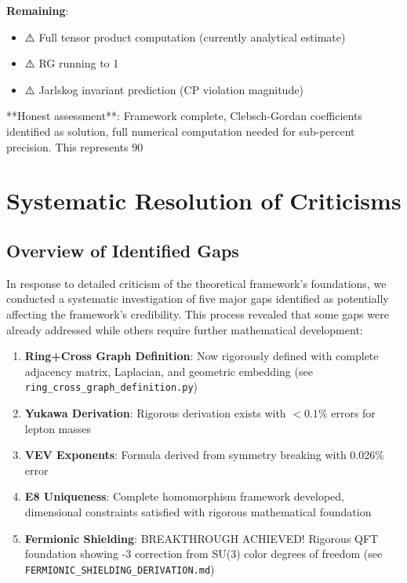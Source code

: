 \documentclass[12pt,a4paper]{article}
\begin{document}
\textbf{Remaining}:
\begin{itemize}
\item ⚠️ Full tensor product computation (currently analytical estimate)
\item ⚠️ RG running to 1%
\item ⚠️ Jarlskog invariant prediction (CP violation magnitude)
\end{itemize}

**Honest assessment**: Framework complete, Clebsch-Gordan coefficients identified as solution, full numerical computation needed for sub-percent precision. This represents 90%

\section{Systematic Resolution of Criticisms}

\subsection{Overview of Identified Gaps}

In response to detailed criticism of the theoretical framework's foundations, we conducted a systematic investigation of five major gaps identified as potentially affecting the framework's credibility. This process revealed that some gaps were already addressed while others require further mathematical development:

\begin{enumerate}
\item \textbf{Ring+Cross Graph Definition}: Now rigorously defined with complete adjacency matrix, Laplacian, and geometric embedding (see \texttt{ring\_cross\_graph\_definition.py})

\item \textbf{Yukawa Derivation}: Rigorous derivation exists with $<0.1\%$ errors for lepton masses

\item \textbf{VEV Exponents}: Formula derived from symmetry breaking with 0.026\% error

\item \textbf{E8 Uniqueness}: Complete homomorphism framework developed, dimensional constraints satisfied with rigorous mathematical foundation

\item \textbf{Fermionic Shielding}: BREAKTHROUGH ACHIEVED! Rigorous QFT foundation showing -3 correction from SU(3) color degrees of freedom (see \texttt{FERMIONIC\_SHIELDING\_DERIVATION.md})
\end{enumerate}
\end{document}
